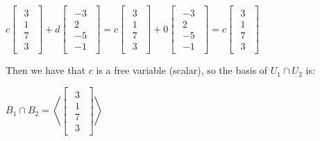 \begin{math}
    c\begin{bmatrix}
        \begin{array}{c}
            3 \\
            1 \\
            7 \\
            3
        \end{array}
    \end{bmatrix}+
    d\begin{bmatrix}
        \begin{array}{c}
            -3 \\
            2  \\
            -5 \\
            -1
        \end{array}
    \end{bmatrix}=
    c\begin{bmatrix}
        \begin{array}{c}
            3 \\
            1 \\
            7 \\
            3
        \end{array}
    \end{bmatrix}+
    0\begin{bmatrix}
        \begin{array}{c}
            -3 \\
            2  \\
            -5 \\
            -1
        \end{array}
    \end{bmatrix}=
    c\begin{bmatrix}
        \begin{array}{c}
            3 \\
            1 \\
            7 \\
            3
        \end{array}
    \end{bmatrix}
\end{math}

\singlespacing
\singlespacing
\singlespacing

Then we have that $c$ is a free variable (scalar), so the basis of $U_1 \cap U_2$ is:

\singlespacing
\singlespacing

\begin{math}
    B_1 \cap B_2 = \left<\begin{bmatrix}
        \begin{array}{c}
            3 \\
            1 \\
            7 \\
            3
        \end{array}
    \end{bmatrix}\right>
\end{math}

